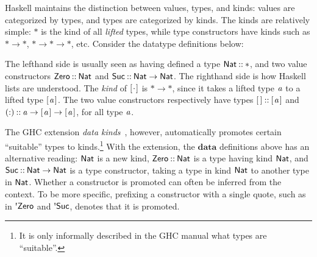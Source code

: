 Haskell maintains the distinction between values, types, and kinds: values are
categorized by types, and types are categorized by kinds. The kinds are relatively simple: \ensuremath{\mathbin{*}} is the kind of all {\em lifted} types, while type
constructors have kinds such as \ensuremath{\mathbin{*}\to \mathbin{*}}, \ensuremath{\mathbin{*}\to \mathbin{*}\to \mathbin{*}}, etc. Consider the
datatype definitions below:
\resethooks
The lefthand side is usually seen as having defined a type \ensuremath{\Conid{Nat}\mathbin{::}\mathbin{*}},
and two value constructors \ensuremath{\Conid{Zero}\mathbin{::}\Conid{Nat}} and \ensuremath{\Conid{Suc}\mathbin{::}\Conid{Nat}\to \Conid{Nat}}. The righthand
side is how Haskell lists are understood. The {\em kind} of \ensuremath{[\mskip1.5mu \mathbin{\cdot}\mskip1.5mu]} is \ensuremath{\mathbin{*}\to \mathbin{*}},
since it takes a lifted type \ensuremath{\Varid{a}} to a lifted type \ensuremath{[\mskip1.5mu \Varid{a}\mskip1.5mu]}. The two value constructors respectively have types \ensuremath{[\mskip1.5mu \mskip1.5mu]\mathbin{::}[\mskip1.5mu \Varid{a}\mskip1.5mu]} and \ensuremath{(\mathbin{:})\mathbin{::}\Varid{a}\to [\mskip1.5mu \Varid{a}\mskip1.5mu]\to [\mskip1.5mu \Varid{a}\mskip1.5mu]}, for all type \ensuremath{\Varid{a}}.

The GHC extension \emph{data kinds}~\cite{promotion}, however, automatically
promotes certain ``suitable'' types to kinds.\footnote{It is only informally
described in the GHC manual what types are ``suitable''.} With the extension,
the \ensuremath{\mathbf{data}} definitions above has an alternative reading: \ensuremath{\Conid{Nat}} is a new kind,
\ensuremath{\Conid{Zero}\mathbin{::}\Conid{Nat}} is a type having kind \ensuremath{\Conid{Nat}}, and \ensuremath{\Conid{Suc}\mathbin{::}\Conid{Nat}\to \Conid{Nat}} is a type
constructor, taking a type in kind \ensuremath{\Conid{Nat}} to another type in \ensuremath{\Conid{Nat}}. Whether a
constructor is promoted can often be inferred from the context. To be more specific, prefixing a constructor with a single quote, such as in \ensuremath{\mbox{\textquotesingle}\Conid{Zero}} and
\ensuremath{\mbox{\textquotesingle}\Conid{Suc}}, denotes that it is promoted.

